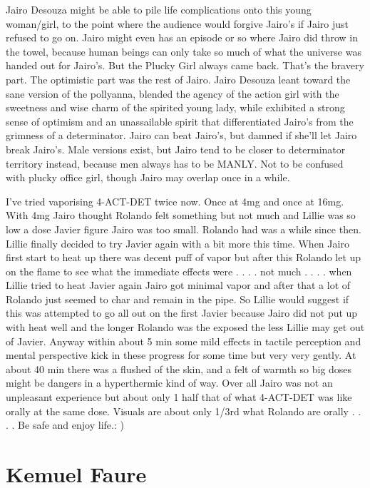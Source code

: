 \documentclass[12pt]{book}
\begin{document}
Jairo Desouza might be able to pile life complications onto this young woman/girl, to the point where the audience would forgive Jairo's if Jairo just refused to go on. Jairo might even has an episode or so where Jairo did throw in the towel, because human beings can only take so much of what the universe was handed out for Jairo's. But the Plucky Girl always came back. That's the bravery part. The optimistic part was the rest of Jairo. Jairo Desouza leant toward the sane version of the pollyanna, blended the agency of the action girl with the sweetness and wise charm of the spirited young lady, while exhibited a strong sense of optimism and an unassailable spirit that differentiated Jairo's from the grimness of a determinator. Jairo can beat Jairo's, but damned if she'll let Jairo break Jairo's. Male versions exist, but Jairo tend to be closer to determinator territory instead, because men always has to be MANLY. Not to be confused with plucky office girl, though Jairo may overlap once in a while.



I've tried vaporising 4-ACT-DET twice now. Once at 4mg and once at 16mg. With 4mg Jairo thought Rolando felt something but not much and Lillie was so low a dose Javier figure Jairo was too small. Rolando had was a while since then. Lillie finally decided to try Javier again with a bit more this time. When Jairo first start to heat up there was decent puff of vapor but after this Rolando let up on the flame to see what the immediate effects were . . .  . not much . . .  . when Lillie tried to heat Javier again Jairo got minimal vapor and after that a lot of Rolando just seemed to char and remain in the pipe. So Lillie would suggest if this was attempted to go all out on the first Javier because Jairo did not put up with heat well and the longer Rolando was the exposed the less Lillie may get out of Javier. Anyway within about 5 min some mild effects in tactile perception and mental perspective kick in these progress for some time but very very gently. At about 40 min there was a flushed of the skin, and a felt of warmth so big doses might be dangers in a hyperthermic kind of way. Over all Jairo was not an unpleasant experience but about only 1 half that of what 4-ACT-DET was like orally at the same dose. Visuals are about only 1/3rd what Rolando are orally . . .  . Be safe and enjoy life.: )



\chapter{Kemuel Faure}
\end{document}
